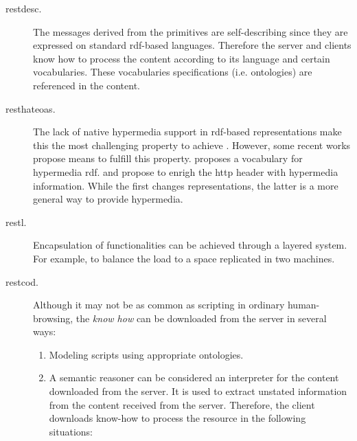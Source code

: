 \begin{description}
	\item[\ac{restdesc}.] The messages derived from the primitives are self-describing since they are expressed on standard \ac{rdf}-based languages. %
				Therefore the server and clients know how to process the content according to its language and certain vocabularies.
				These vocabularies specifications (i.e. ontologies) are referenced in the content.
	\item[\ac{resthateoas}.] The lack of native hypermedia support in \ac{rdf}-based representations make this the most challenging property to achieve \citep{page_rest_2011}. %
				  However, some recent works propose means to fulfill this property.
				  \citet{kjernsmo_necessity_2012} proposes a vocabulary for hypermedia \ac{rdf}.
				  \citet{steiner_fulfilling_2011} and \citet{verborgh_functional_2012} propose to enrigh the \ac{http} header with hypermedia information.
				  While the first changes representations, the latter is a more general way to provide hypermedia.
 \item[\ac{restl}.] Encapsulation of functionalities can be achieved through a layered system.
                     For example, to balance the load to a space replicated in two machines.
 \item[\ac{restcod}.] Although it may not be as common as scripting in ordinary human-browsing, %
            the \emph{know how} can be downloaded from the server in several ways:
            \begin{enumerate}
	      \item Modeling scripts using appropriate ontologies. %
	      \item A semantic reasoner can be considered an interpreter for the content downloaded from the server.
	            It is used to extract unstated information from the content received from the server.
	            Therefore, the client downloads know-how to process the resource in the following situations:
		    \begin{itemize}

\end{itemize}
\end{enumerate}
\end{description}
